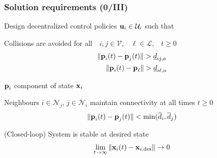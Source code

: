 \begin{frame} %
  \frametitle{Solution requirements (0/III)}

  Design decentralized control policies $\bm{\mathbf{u}}_i \in \mathcal{U}_i$ such that\\[3ex]

  \begin{ww_box}
  \begin{wideitemize}

    \item<2-> Collisions are avoided for all\ \ $i,j \in \mathcal{V}$,\ \ $\ell \in \mathcal{L}$,\ \ $t \geq 0$
      \begin{align}
        \|\bm{\mathbf{p}}_i(t) - \bm{\mathbf{p}}_{j}(t)\| > \underline{d}_{ij,a} \\
        \|\bm{\mathbf{p}}_i(t) - \bm{\mathbf{p}}_\ell\| > \underline{d}_{i\ell,o}
      \end{align}

      $\bm{\mathbf{p}}_i$ component of state $\bm{\mathbf{x}}_i$\\[3ex]

    \item<2-> Neighbours $i \in \mathcal{N}_j$, $j \in \mathcal{N}_i$
      maintain connectivity at all times $t \geq 0$
      \begin{align}
        \|\bm{\mathbf{p}}_i(t) - \bm{\mathbf{p}}_{j}(t)\| < \text{min}(\overline{d}_{i}, \overline{d}_{j})
      \end{align}
  \end{wideitemize}
  \end{ww_box}

  \begin{wideitemize}
    \item<3-> (Closed-loop) System is stable at desired state
      \begin{align}
        \lim\limits_{t \to \infty}\|\bm{\mathbf{x}}_i(t) - \bm{\mathbf{x}}_{i,\text{des}}\| \to 0 \\
      \end{align}

  \end{wideitemize}

\end{frame} %
